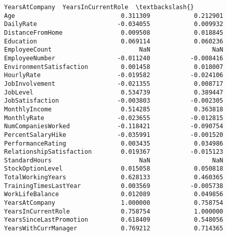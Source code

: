 \documentclass[11pt]{article}
\begin{document}
\begin{Verbatim}[commandchars=\\\{\}]
                          YearsAtCompany  YearsInCurrentRole  \textbackslash{}
Age                             0.311309            0.212901   
DailyRate                      -0.034055            0.009932   
DistanceFromHome                0.009508            0.018845   
Education                       0.069114            0.060236   
EmployeeCount                        NaN                 NaN   
EmployeeNumber                 -0.011240           -0.008416   
EnvironmentSatisfaction         0.001458            0.018007   
HourlyRate                     -0.019582           -0.024106   
JobInvolvement                 -0.021355            0.008717   
JobLevel                        0.534739            0.389447   
JobSatisfaction                -0.003803           -0.002305   
MonthlyIncome                   0.514285            0.363818   
MonthlyRate                    -0.023655           -0.012815   
NumCompaniesWorked             -0.118421           -0.090754   
PercentSalaryHike              -0.035991           -0.001520   
PerformanceRating               0.003435            0.034986   
RelationshipSatisfaction        0.019367           -0.015123   
StandardHours                        NaN                 NaN   
StockOptionLevel                0.015058            0.050818   
TotalWorkingYears               0.628133            0.460365   
TrainingTimesLastYear           0.003569           -0.005738   
WorkLifeBalance                 0.012089            0.049856   
YearsAtCompany                  1.000000            0.758754   
YearsInCurrentRole              0.758754            1.000000   
YearsSinceLastPromotion         0.618409            0.548056   
YearsWithCurrManager            0.769212            0.714365   


\end{Verbatim}
\end{document}
